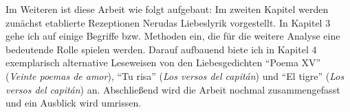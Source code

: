 
Im Weiteren ist diese Arbeit wie folgt aufgebaut:
Im zweiten Kapitel werden zunächst etablierte Rezeptionen Nerudas Liebeslyrik vorgestellt.
In Kapitel 3 gehe ich auf einige Begriffe bzw. Methoden ein, die für die weitere Analyse eine bedeutende Rolle spielen werden.
Darauf aufbauend biete ich in Kapitel 4 exemplarisch alternative Leseweisen von den Liebesgedichten ``Poema XV'' (\textit{Veinte poemas de amor}), ``Tu risa'' (\textit{Los versos del capitán}) und ``El tigre'' (\textit{Los versos del capitán}) an.
Abschließend wird die Arbeit nochmal zusammengefasst und ein Ausblick wird umrissen.

